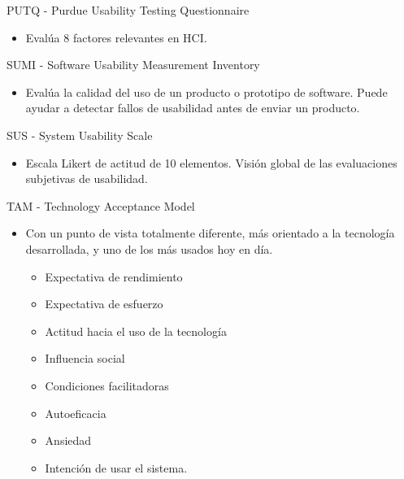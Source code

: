 \documentclass[12pt, twoside, openright]{report} %
\begin{document}
        PUTQ - Purdue Usability Testing Questionnaire

        \begin{itemize}
        
        \item
          Evalúa 8 factores relevantes en HCI.
        \end{itemize}

        SUMI - Software Usability Measurement Inventory

        \begin{itemize}
        
        \item
          Evalúa la calidad del uso de un producto o prototipo de
          software. Puede ayudar a detectar fallos de usabilidad antes
          de enviar un producto.
        \end{itemize}

        SUS - System Usability Scale

        \begin{itemize}
        
        \item
          Escala Likert de actitud de 10 elementos. Visión global de las
          evaluaciones subjetivas de usabilidad.
        \end{itemize}
\pagebreak
        TAM - Technology Acceptance Model

        \begin{itemize}
        
        \item
          Con un punto de vista totalmente diferente, más orientado a la
          tecnología desarrollada, y uno de los más usados hoy en día.

          \begin{itemize}
          
          \item
            Expectativa de rendimiento
          \item
            Expectativa de esfuerzo
          \item
            Actitud hacia el uso de la tecnología
          \item
            Influencia social
          \item
            Condiciones facilitadoras
          \item
            Autoeficacia
          \item
            Ansiedad
          \item
            Intención de usar el sistema.
          \end{itemize}
        \end{itemize}
\end{document}
